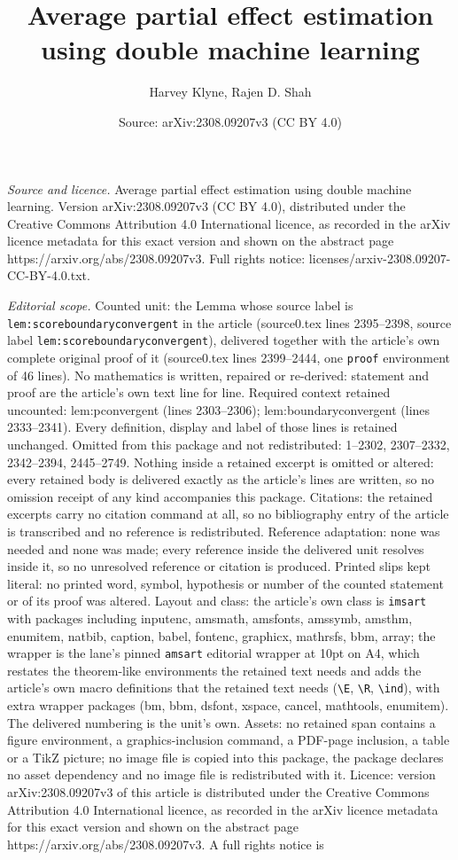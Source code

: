 \documentclass[10pt,a4paper]{amsart}
\title[Average partial effect estimation using double machine learn]{Average partial effect estimation using double machine learning}
\author{Harvey Klyne, Rajen D. Shah}
\date{Source: arXiv:2308.09207v3 (CC BY 4.0)}
\begin{document}
\maketitle

\noindent\emph{Source and licence.} Average partial effect estimation using double machine learning. Version arXiv:2308.09207v3 (CC BY 4.0), distributed under the Creative Commons Attribution 4.0 International licence, as recorded in the arXiv licence metadata for this exact version and shown on the abstract page https://arxiv.org/abs/2308.09207v3. Full rights notice: licenses/arxiv-2308.09207-CC-BY-4.0.txt.\par\smallskip

\noindent\textit{Editorial scope.} Counted unit: the Lemma whose source label is \texttt{lem:scoreboundaryconvergent} in the article (source0.tex lines 2395--2398, source label \texttt{lem:scoreboundaryconvergent}), delivered together with the article's own complete original proof of it (source0.tex lines 2399--2444, one \texttt{proof} environment of 46 lines). No mathematics is written, repaired or re-derived: statement and proof are the article's own text line for line. Required context retained uncounted: lem:pconvergent (lines 2303--2306); lem:boundaryconvergent (lines 2333--2341). Every definition, display and label of those lines is retained unchanged. Omitted from this package and not redistributed: 1--2302, 2307--2332, 2342--2394, 2445--2749. Nothing inside a retained excerpt is omitted or altered: every retained body is delivered exactly as the article's lines are written, so no omission receipt of any kind accompanies this package. Citations: the retained excerpts carry no citation command at all, so no bibliography entry of the article is transcribed and no reference is redistributed. Reference adaptation: none was needed and none was made; every reference inside the delivered unit resolves inside it, so no unresolved reference or citation is produced. Printed slips kept literal: no printed word, symbol, hypothesis or number of the counted statement or of its proof was altered. Layout and class: the article's own class is \texttt{imsart} with packages including inputenc, amsmath, amsfonts, amssymb, amsthm, enumitem, natbib, caption, babel, fontenc, graphicx, mathrsfs, bbm, array; the wrapper is the lane's pinned \texttt{amsart} editorial wrapper at 10pt on A4, which restates the theorem-like environments the retained text needs and adds the article's own macro definitions that the retained text needs (\texttt{\textbackslash E}, \texttt{\textbackslash R}, \texttt{\textbackslash ind}), with extra wrapper packages (bm, bbm, dsfont, xspace, cancel, mathtools, enumitem). The delivered numbering is the unit's own. Assets: no retained span contains a figure environment, a graphics-inclusion command, a PDF-page inclusion, a table or a TikZ picture; no image file is copied into this package, the package declares no asset dependency and no image file is redistributed with it. Licence: version arXiv:2308.09207v3 of this article is distributed under the Creative Commons Attribution 4.0 International licence, as recorded in the arXiv licence metadata for this exact version and shown on the abstract page https://arxiv.org/abs/2308.09207v3. A full rights notice is 
\end{document}
